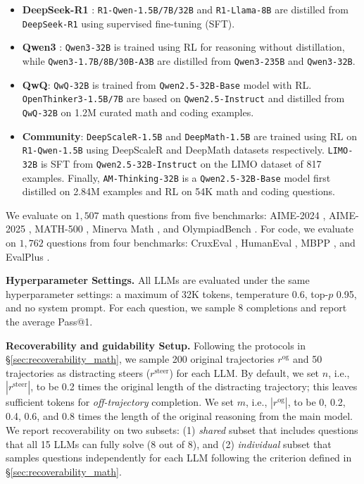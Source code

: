 \documentclass{article} %
\begin{document}
\begin{itemize}[leftmargin=*, itemsep=1pt, topsep=0pt, parsep=0pt, partopsep=0pt, align=parleft]
    \item \textbf{DeepSeek-R1} \citep{guo2025deepseek}: \texttt{R1-Qwen-1.5B/7B/32B} and \texttt{R1-Llama-8B} are distilled from \texttt{DeepSeek-R1} using supervised fine-tuning (SFT).
    \item \textbf{Qwen3} \citep{yang2025qwen3}: \texttt{Qwen3-32B} is trained using RL for reasoning without distillation, while \texttt{Qwen3-1.7B/8B/30B-A3B} are distilled from \texttt{Qwen3-235B} and \texttt{Qwen3-32B}.
    \item \textbf{QwQ}: \texttt{QwQ-32B} \citep{qwq32b} is trained from \texttt{Qwen2.5-32B-Base} model with RL. \texttt{OpenThinker3-1.5B/7B} \citep{guha2025openthoughts} are based on \texttt{Qwen2.5-Instruct} and distilled from \texttt{QwQ-32B} on 1.2M curated math and coding examples.
    \item \textbf{Community}: \texttt{DeepScaleR-1.5B} \citep{deepscaler2025} and \texttt{DeepMath-1.5B} \citep{he2025deepmath} are trained using RL on \texttt{R1-Qwen-1.5B} using DeepScaleR and DeepMath datasets respectively. \texttt{LIMO-32B} \citep{ye2025limoreasoning} is SFT from \texttt{Qwen2.5-32B-Instruct} on the LIMO dataset of 817 examples. Finally, \texttt{AM-Thinking-32B} \citep{ji2025thinking} is a \texttt{Qwen2.5-32B-Base} model first distilled on 2.84M examples and RL on 54K math and coding questions.
\end{itemize}

We evaluate on $1,507$ math questions from five benchmarks: AIME-2024 \citep{maa2024aime}, AIME-2025 \citep{maa2025aime}, MATH-500 \citep{hendrycks2021measuring}, Minerva Math \citep{lewkowycz2022solving}, and OlympiadBench \citep{he-etal-2024-olympiadbench}. For code, we evaluate on $1,762$ questions from four benchmarks: CruxEval \citep{gu2024cruxeval}, HumanEval \citep{chen2021evaluating}, MBPP \citep{austin2021program}, and EvalPlus \citep{liu2023your}.

\textbf{Hyperparameter Settings.} All LLMs are evaluated under the same hyperparameter settings: a maximum of 32K tokens, temperature 0.6, top-$p$ 0.95, and no system prompt. For each question, we sample 8 completions and report the average Pass@1.

\textbf{Recoverability and guidability Setup.} Following the protocols in \S\ref{sec:recoverability_math}, we sample 200 original trajectories $r^\mathrm{og}$ and 50 trajectories as distracting steers ($r^\mathrm{steer}$) for each LLM. By default, we set $n$, i.e., $|r^\mathrm{steer}|$, to be 0.2 times the original length of the distracting trajectory; this leaves sufficient tokens for \textit{off-trajectory} completion. We set $m$, i.e., $|r^\mathrm{og}|$, to be 0, 0.2, 0.4, 0.6, and 0.8 times the length of the original reasoning from the main model. We report recoverability on two subsets: (1) \textit{shared} subset that includes questions that all 15 LLMs can fully solve (8 out of 8), and (2) \textit{individual} subset that samples questions independently for each LLM following the criterion defined in \S\ref{sec:recoverability_math}.
\end{document}
